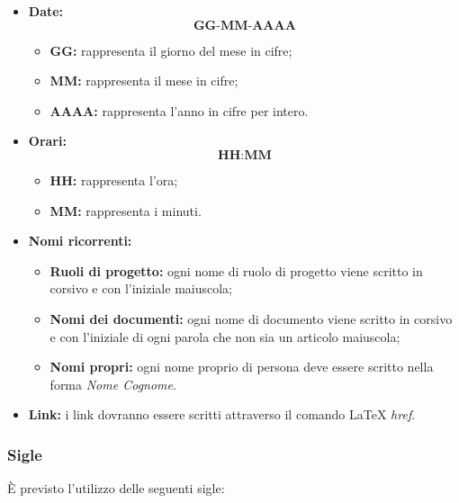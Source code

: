 \documentclass[../NormediProgetto.tex]{subfiles}
\begin{document}
\begin{itemize}

\item{\textbf{Date:}}  \[\textbf{GG-MM-AAAA}\]
\begin{itemize}
\item{\textbf{GG:}} rappresenta il giorno del mese in cifre;
\item{\textbf{MM:}} rappresenta il mese in cifre;
\item{\textbf{AAAA:}} rappresenta l'anno in cifre per intero.

\end{itemize}

\item{\textbf{Orari:}} \[\textbf{HH:MM}\]
\begin{itemize}
\item{\textbf{HH:}} rappresenta l'ora;
\item{\textbf{MM:}} rappresenta i minuti.
\end{itemize}

\item{\textbf{Nomi ricorrenti:}}
\begin{itemize}
\item{\textbf{Ruoli di progetto:}} ogni nome di ruolo di progetto viene scritto in corsivo e con l’iniziale maiuscola;
\item{\textbf{Nomi dei documenti:}}  ogni nome di documento viene scritto in corsivo e con l’iniziale di ogni parola che non sia un articolo maiuscola;
\item{\textbf{Nomi propri:}} ogni nome proprio di persona deve essere scritto nella forma \textit{Nome Cognome}.
\end{itemize}

\item{\textbf{Link:}} i link dovranno essere scritti attraverso il comando \LaTeX{} \textit{href}.
\end{itemize}

\subsubsection{Sigle}

È previsto l’utilizzo delle seguenti sigle: 
\end{document}
